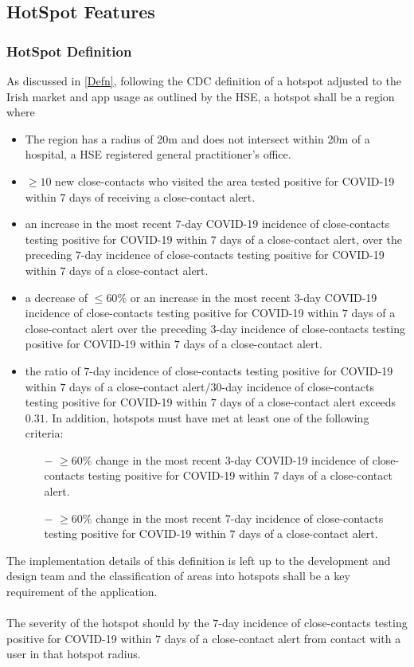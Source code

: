 \documentclass{scrreprt}
\begin{document}
\subsection{HotSpot Features}

\subsubsection{HotSpot Definition}
As discussed in \ref{Defn}, following the CDC definition of a hotspot adjusted to the Irish market and app usage as outlined by the HSE, a hotspot shall be a region where
\begin{itemize}
	\item The region has a radius of 20m and does not intersect within 20m of a hospital, a HSE registered general practitioner's office.
	\item  $\geq 10$ new close-contacts who visited the area tested positive for COVID-19 within $7$ days of receiving a close-contact alert.
	\item an increase in the most recent $7$-day COVID-19 incidence of close-contacts testing positive for COVID-19 within $7$ days of a close-contact alert, over the preceding $7$-day incidence of close-contacts testing positive for COVID-19 within $7$ days of a close-contact alert.
	\item a decrease of $\leq 60\%$ or an increase in the most recent $3$-day COVID-19 incidence of close-contacts testing positive for COVID-19 within $7$ days of a close-contact alert over the preceding $3$-day incidence of close-contacts testing positive for COVID-19 within $7$ days of a close-contact alert. 
	\item the ratio of $7$-day incidence of close-contacts testing positive for COVID-19 within $7$ days of a close-contact alert/$30$-day incidence of close-contacts testing positive for COVID-19 within $7$ days of a close-contact alert exceeds $0.31$. In addition, hotspots must have met at least one of the following criteria: 
	\begin{itemize}
		\item[$-$] $\geq 60\%$ change in the most recent 3-day COVID-19 incidence of close-contacts testing positive for COVID-19 within $7$ days of a close-contact alert.
		\item[$-$]$\geq 60\%$ change in the most recent 7-day incidence of close-contacts testing positive for COVID-19 within $7$ days of a close-contact alert.
	\end{itemize}
\end{itemize}
The implementation details of this definition is left up to the development and design team and the classification of areas into hotspots shall be a key requirement of the application.\\
\\
The severity of the hotspot should by the $7$-day incidence of close-contacts testing positive for COVID-19 within $7$ days of a close-contact alert from contact with a user in that hotspot radius.
\end{document}
